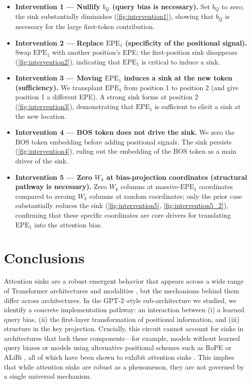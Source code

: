 \documentclass[11pt]{article}
\newif\ifYRMcomments
\newcommand{\YRM}[1]{\ifYRMcomments\textcolor{red}{[YRM: #1]}\fi}
\begin{document}
\begin{itemize}[leftmargin=*]
  \item \textbf{Intervention 1 — Nullify $b_Q$ (query bias is necessary).} Set $b_Q$ to zero; the sink substantially diminishes (\cref{fig:intervention1}), showing that $b_Q$ is necessary for the large first-token contribution.
  \item \textbf{Intervention 2 — Replace $\mathrm{EPE}_1$ (specificity of the positional signal).} Swap $\mathrm{EPE}_1$ with another position’s EPE; the first-position sink disappears (\cref{fig:intervention2}), indicating that $\mathrm{EPE}_1$ is critical to induce a sink.
  \item \textbf{Intervention 3 — Moving $\mathrm{EPE}_1$ induces a sink at the new token (sufficiency).} We transplant $\mathrm{EPE}_1$ from position 1 to position 2 (and give position 1 a different EPE). A strong sink forms at position 2 (\cref{fig:intervention3}), demonstrating that $\mathrm{EPE}_1$ is sufficient to elicit a sink at the new location.
  \item \textbf{Intervention 4 — BOS token does not drive the sink.} We zero the BOS token embedding before adding positional signals. The sink persists (\cref{fig:intervention4}), ruling out the embedding of the BOS token as a main driver of the sink.
  \item \textbf{Intervention 5 — Zero $W_k$ at bias-projection coordinates (structural pathway is necessary).} Zero $W_k$ columns at massive-$\mathrm{EPE}_1$ coordinates compared to zeroing $W_k$ columns at random coordinates; only the prior case substantially reduces the sink (\cref{fig:intervention5}, \cref{fig:intervention5_2}), confirming that these specific coordinates are core drivers for translating $\mathrm{EPE}_1$ into the attention bias.
\end{itemize}

\section{Conclusions}
Attention sinks are a robust emergent behavior that appears across a wide range of Transformer architectures and modalities \YRM{cite all relevant papers from RW}, but the mechanisms behind them differ across architectures. In the GPT-2–style sub-architecture we studied, we identify a concrete implementation pathway: an interaction between (i) a learned query bias, (ii) the first-layer transformation of positional information, and (iii) structure in the key projection. Crucially, this circuit cannot account for sinks in architectures that lack these components—for example, models without learned query biases \YRM{cite} or models using alternative positional schemes such as RoPE or ALiBi \YRM{cite both}, all of which have been shown to exhibit attention sinks \YRM{cite all relevant papers from RW}. This implies that while attention sinks are robust as a phenomenon, they are not governed by a single universal mechanism.
\end{document}
